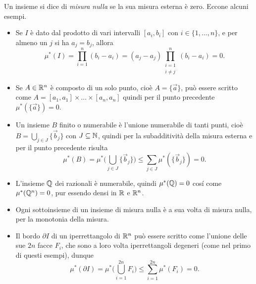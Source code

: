 Un insieme si dice di \emph{misura nulla} se la sua misura esterna è zero.
Eccone alcuni esempi.
\begin{itemize}
	\item Se $I$ è dato dal prodotto di vari intervalli $[a_i,b_i]$ con $i\in\{1,\dots,n\}$, e per almeno un $j$ si ha $a_j=b_j$, allora
		\begin{equation}
			\mu^*(I)=\prod_{i=1}^n(b_i-a_i)=(a_j-a_j)\prod_{\substack{i=1\\i\neq j}}^n(b_i-a_i)=0.
		\end{equation}
	\item Se $A\in\mathbb{R}^n$ è composto di un solo punto, cioè $A=\{\vec a\}$, può essere scritto come $A=[a_1,a_1]\times\dots\times[a_n,a_n]$ quindi per il punto precedente $\mu^*(\{\vec a\})=0$.
	\item Un insieme $B$ finito o numerabile è l'unione numerabile di tanti punti, cioè $B=\bigcup_{j\in J}\{\vec b_j\}$ con $J\subseteq\mathbb{N}$, quindi per la subadditività della misura esterna e per il punto precedente risulta
		\begin{equation}
			\mu^*(B)=\mu^*\bigg(\bigcup_{j\in J}\{\vec b_j\}\bigg)\leq\sum_{j\in J}\mu^*(\{\vec b_j\})=0.
		\end{equation}
	\item L'insieme $\mathbb{Q}$ dei razionali è numerabile, quindi $\mu^*(\mathbb{Q})=0$ cos\'i come $\mu^*(\mathbb{Q}^n)=0$, pur essendo densi in $\mathbb{R}$ e $\mathbb{R}^n$.
	\item Ogni sottoinsieme di un insieme di misura nulla è a sua volta di misura nulla, per la monotonia della misura.
	\item Il bordo $\partial I$ di un iperrettangolo di $\mathbb{R}^n$ può essere scritto come l'unione delle sue $2n$ facce $F_i$, che sono a loro volta iperrettangoli degeneri (come nel primo di questi esempi), dunque
		\begin{equation}
			\mu^*(\partial I)=\mu^*\bigg(\bigcup_{i=1}^{2n} F_i\bigg)\leq\sum_{i=1}^{2n}\mu^*(F_i)=0.
		\end{equation}
\end{itemize}

